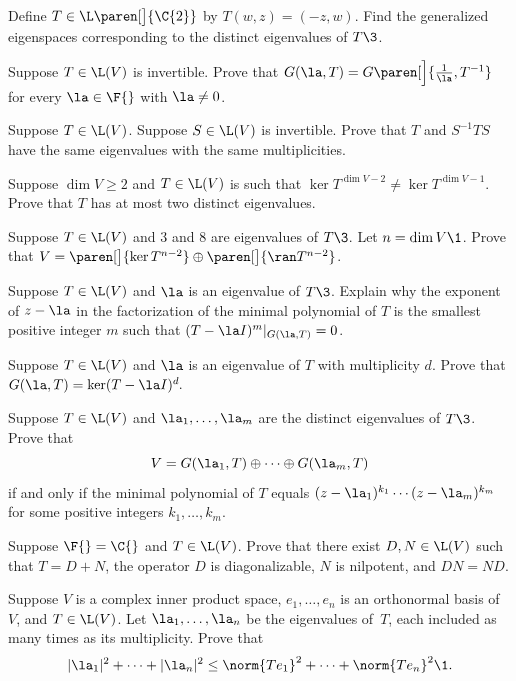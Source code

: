 
\exercise
Define $T \in \L\paren[\big]{\C{2}}$ by
$
T(w,z) = (-z, w)$.
Find the generalized eigenspaces corresponding to the distinct eigenvalues of $T\3$.


\exercise
Suppose $T \in \L(V)$ is invertible. Prove that $G(\la, T) = G\paren[\Big]{\frac{1}{\la}, T^{-1}}$ for every $\la \in \F{}$ with $\la \ne 0$.


\exercise
Suppose $T \in \L(V)$.  Suppose $S \in \L(V)$ is invertible. Prove that $T$ and $S^{-1} T S$ have the same eigenvalues with the same multiplicities.


\exercise
Suppose $\dim V \ge 2$ and $T \in \L(V)$ is such that $\ker T^{\dim V-2\!}  \ne \ker T^{\dim V-1\!}$.
Prove that $T$ has at most two distinct eigenvalues.


\exercise
Suppose $T \in \L(V)$ and $3$ and $8$ are eigenvalues of $T\3$. Let $n = \dim V\1$. Prove that
$V = \paren[\big]{\ker T^{n-2}} \oplus \paren[\big]{\ran T^{n-2}}$.


\exercise
Suppose $T \in \L(V)$ and $\la$ is an eigenvalue of $T\3$. Explain why the exponent of $z-\la$ in the factorization of the minimal polynomial of $T$ is the smallest positive integer $m$ such that $(T - \la I)^m|_{G(\la, T)} = 0$.


\exercise
Suppose $T \in \L(V)$ and $\la$ is an eigenvalue of $T$ with multiplicity $d$. Prove that
$
G(\la, T) = \ker(T - \la I)^d\!$.


\exercise
Suppose $T \in \L(V)$ and $\la_1, \ldots, \la_m$ are the distinct eigenvalues of $T\3$. Prove that\label{8Rdecomp}
\[
V = G(\la_1, T) \oplus \cdots \oplus G(\la_m, T)
\]
if and only if the minimal polynomial of $T$ equals
$(z-\la_1)^{k_1} \cdots (z - \la_m)^{k_m}$ for some positive integers $k_1, \ldots, k_m$.


\exercise
Suppose $\F{} = \C{}$ and $T \in \L(V)$. Prove that there exist $D, N \in \L(V)$ such that $T = D + N$, the operator $D$ is diagonalizable, $N$ is nilpotent, and $DN = ND$.


\exercise
Suppose $V$ is a complex inner product space, $e_1, \ldots, e_n$ is an orthonormal basis of $V$, and $T \in \L(V)$.  Let
$\la_1, \dots, \la_n$ be the eigenvalues of~$T$, each included as many times as its multiplicity. Prove that
\[
|\la_1|^2 + \dots + |\la_n|^2 \le \norm{Te_1}^2 + \cdots + \norm{Te_n}^2\1.
\]


